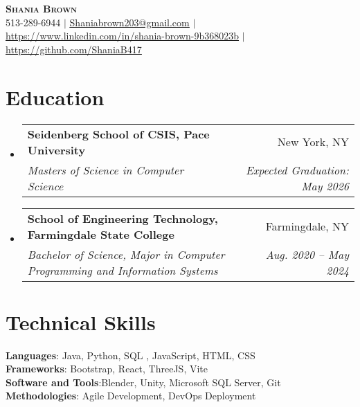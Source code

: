 \documentclass[letterpaper,11pt]{article}
\makeatletter
\newcommand{\resumeSubheading}[4]{
  \vspace{-2pt}\item
    \begin{tabular*}{0.97\textwidth}[t]{l@{\extracolsep{\fill}}r}
      \textbf{#1} & #2 \\
      \textit{\small#3} & \textit{\small #4} \\
    \end{tabular*}\vspace{-7pt}
}
\newcommand{\resumeSubHeadingListStart}{\begin{itemize}[leftmargin=0.15in, label={}]}
\newcommand{\resumeSubHeadingListEnd}{\end{itemize}}
\makeatother
\begin{document}

\begin{center}
    \textbf{\Huge \scshape Shania Brown} \\ \vspace{1pt}
    \small 513-289-6944 $|$ \href{mailto:x@x.com}{\underline{Shaniabrown203@gmail.com}} $|$ 
    \href{https://linkedin.com/in/...}{\underline{https://www.linkedin.com/in/shania-brown-9b368023b}} $|$
    \href{https://github.com/...}{\underline{https://github.com/ShaniaB417}}
\end{center}


\section{Education}
  \resumeSubHeadingListStart
    \resumeSubheading
      {Seidenberg School of CSIS, Pace University}{New York, NY}
      {Masters of Science in Computer Science}{Expected Graduation: May 2026}
    \resumeSubheading
      {School of Engineering Technology, Farmingdale State College }{Farmingdale, NY}
      {Bachelor of Science, Major in Computer Programming and Information Systems }{Aug. 2020 -- May 2024}
  \resumeSubHeadingListEnd



\section{Technical Skills}
 \begin{itemize}[leftmargin=0.15in, label={}]
    \small{\item{
     \textbf{Languages}{: Java, Python, SQL , JavaScript, HTML, CSS } \\
     \textbf{Frameworks}{: Bootstrap, React, ThreeJS, Vite } \\
     \textbf{Software and Tools}{:Blender, Unity, Microsoft SQL Server, Git } \\
     \textbf{Methodologies}{: Agile Development, DevOps Deployment}
    }}
 \end{itemize}
\end{document}
